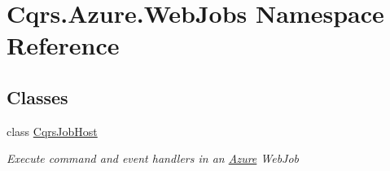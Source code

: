 \hypertarget{namespaceCqrs_1_1Azure_1_1WebJobs}{}\section{Cqrs.\+Azure.\+Web\+Jobs Namespace Reference}
\label{namespaceCqrs_1_1Azure_1_1WebJobs}
\subsection*{Classes}
\begin{DoxyCompactItemize}
\item 
class \hyperlink{classCqrs_1_1Azure_1_1WebJobs_1_1CqrsJobHost}{Cqrs\+Job\+Host}
\begin{DoxyCompactList}\small\item\em Execute command and event handlers in an \hyperlink{namespaceCqrs_1_1Azure}{Azure} Web\+Job \end{DoxyCompactList}\end{DoxyCompactItemize}
